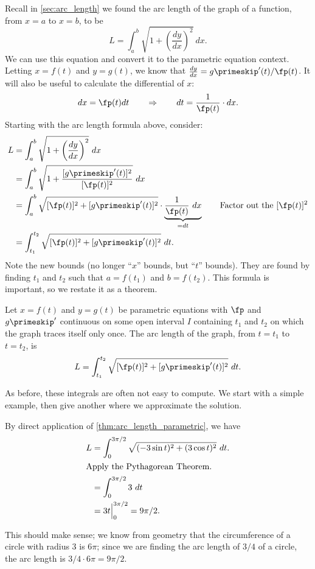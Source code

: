 Recall in \autoref{sec:arc_length} we found the arc length of the graph of a function, from $x=a$ to $x=b$, to be $$L = \int_a^b\sqrt{1+\left(\frac{dy}{dx}\right)^2}\ dx.$$
We can use this equation and convert it to the parametric equation context. Letting $x=f(t)$ and $y=g(t)$, we know that $\frac{dy}{dx} = g\primeskip'(t)/\fp(t)$. It will also be useful to calculate the differential of $x$: $$dx = \fp(t)dt \qquad \Rightarrow \qquad dt = \frac{1}{\fp(t)}\cdot dx.$$
Starting with the arc length formula above, consider:
\begin{align*}
	L &= \int_a^b\sqrt{1+\left(\frac{dy}{dx}\right)^2}\ dx\\
	&= \int_a^b \sqrt{1+\frac{[g\primeskip'(t)]^2}{[\fp(t)]^2}}\ dx \\
	&= \int_a^b \sqrt{[\fp(t)]^2+[g\primeskip'(t)]^2}\cdot\underbrace{\frac1{\fp(t)}\ dx}_{=dt} \qquad\text{Factor out the $[\fp(t)]^2$} \\
	&= \int_{t_1}^{t_2} \sqrt{[\fp(t)]^2+[g\primeskip'(t)]^2}\ dt.\\
\end{align*}
Note the new bounds (no longer ``$x$'' bounds, but ``$t$'' bounds). They are found by finding $t_1$ and $t_2$ such that $a= f(t_1)$ and $b=f(t_2)$. This formula is important, so we restate it as a theorem.

{Let $x=f(t)$ and $y=g(t)$ be parametric equations with $\fp$ and $g\primeskip'$ continuous on some open interval $I$ containing $t_1$ and $t_2$ on which the graph traces itself only once. The arc length of the graph, from $t=t_1$ to $t=t_2$, is
$$L = \int_{t_1}^{t_2} \sqrt{[\fp(t)]^2+[g\primeskip'(t)]^2}\ dt.$$}

As before, these integrals are often not easy to compute. We start with a simple example, then give  another where we approximate the solution.

{By direct application of \autoref{thm:arc_length_parametric}, we have
\begin{align*}
L &= \int_0^{3\pi/2} \sqrt{(-3\sin t)^2 +(3\cos t)^2} \ dt.\\
\intertext{Apply the Pythagorean Theorem.}
	&= \int_0^{3\pi/2} 3 \ dt\\
	&= 3t\Big|_0^{3\pi/2} = 9\pi/2.
	\end{align*}
	
This should make sense; we know from geometry that the circumference of a circle with radius 3 is $6\pi$; since we are finding the arc length of $3/4$ of a circle, the arc length is $3/4\cdot 6\pi = 9\pi/2$.}


